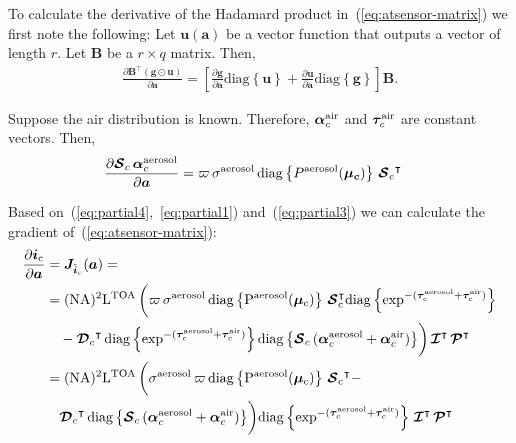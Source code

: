 \documentclass[10pt,twocolumn,letterpaper]{article}
\newcommand{\OpSphere}{\bm{\mathcal{S}}}
\newcommand{\OpDistance}{\bm{\mathcal{D}}}
\newcommand{\OpInt}{\bm{\mathcal{I}}}
\newcommand{\OpCamera}{\bm{\mathcal{P}}}
\newcommand{\OpDiag}[1]{\mathrm{diag}\left\{#1\right\}}
\newcommand{\PartDeriv}[2]{\frac{\partial{#1}}{\partial{#2}}}
\newcommand{\vect}[1]{\bm{#1}}
\newcommand{\mat}[1]{\bm{#1}}
\newcommand{\transpose}[1]{{#1}^\intercal}
\begin{document}
To calculate the derivative of the Hadamard product
in~(\ref{eq:atsensor-matrix}) we first note the following: Let
$\vect{u}(\vect{a})$ be a vector function that outputs a vector of
length $r$. Let $\mat{B}$ be a $r \times q$ matrix. Then,
\begin{align}
  \label{eq:partial1}
  \PartDeriv{\transpose{\mat{B}} (\vect{g} \odot \vect{u})}{\vect{a}}
  = \left[ \PartDeriv{\vect{g}}{\vect{a}} \OpDiag{\vect{u}} +
    \PartDeriv{\vect{u}}{\vect{a}} \OpDiag{\vect{g}} \right]
  \mat{B}.
\end{align}
%
%

Suppose the air distribution is known. Therefore, $\vect{\alpha}^{\rm
  air}_c$ and $\vect{\tau}^{\rm air}_c$ are constant vectors. Then,
\begin{align}
  \label{eq:partial3}
  \PartDeriv{\OpSphere_c \, \vect{\alpha}^{\rm aerosol}_c}{\vect{a}}
  &= \varpi \, \sigma^{\rm aerosol} \, \OpDiag{P^{\rm
      aerosol}(\vect{\mu_c})} \, \transpose{\OpSphere_c}
\end{align}

Based on~(\ref{eq:partial4},~\ref{eq:partial1})
and~(\ref{eq:partial3}) we can calculate the gradient
of~(\ref{eq:atsensor-matrix}):
\begin{align}
  \PartDeriv{\vect{i}_{\rm c}}{\vect{a}} &=
  \mat{J}_{\hat{\vect{i}}_c}(\vect{a})= \nonumber \\
  &= (\rm{NA})^2 \mathrm{L}^{\rm TOA} \, \biggl( \varpi \, \sigma^{\rm
    aerosol} \, \OpDiag{P^{\rm aerosol}(\vect{\mu}_c)} \,
  \transpose{\OpSphere}_c \OpDiag{\exp^{-(\vect{\tau}^{\rm aerosol}_c
      + \vect{\tau}^{\rm
        air}_c)}} \nonumber \\
  &\quad - \transpose{\OpDistance_c} \, \OpDiag{\exp^{-(\vect{\tau}^{\rm
        aerosol}_c + \vect{\tau}^{\rm air}_c)}}\OpDiag{\OpSphere_c \,
    (\vect{\alpha}^{\rm aerosol}_c + \vect{\alpha}^{\rm air}_c)}
  \biggr)
  \, \transpose{\OpInt} \, \transpose{\OpCamera} \nonumber \\
  &= (\rm{NA})^2\mathrm{L}^{\rm TOA} \, \biggl( \sigma^{\rm aerosol}
  \, \varpi \,
  \OpDiag{P^{\rm aerosol}(\vect{\mu}_c)} \, \transpose{\OpSphere_c} - \nonumber \\
  &\quad \transpose{\OpDistance_c} \, \OpDiag{\OpSphere_c \,
    (\vect{\alpha}^{\rm aerosol}_c + \vect{\alpha}^{\rm air}_c )}
  \biggr) \OpDiag{\exp^{-(\vect{\tau}^{\rm aerosol}_c +
      \vect{\tau}^{\rm air}_c)}} \, \transpose{\OpInt} \,
  \transpose{\OpCamera}
\end{align}
\end{document}
